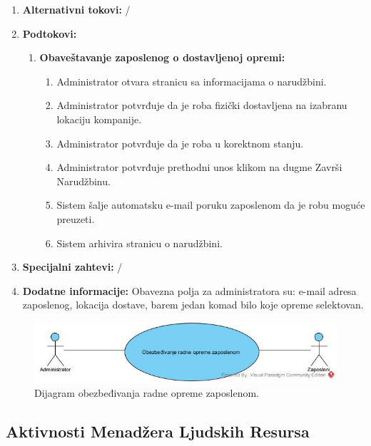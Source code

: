 \documentclass[a4paper]{article}
\begin{document}
\begin{enumerate}
\begin{enumerate}
        \end{enumerate}
    \item \textbf{Alternativni tokovi:} /
    \item \textbf{Podtokovi:}
        \begin{enumerate}
            \item \textbf{Obaveštavanje zaposlenog o dostavljenoj opremi:}
                \begin{enumerate}
                    \item Administrator otvara stranicu sa informacijama o narudžbini.
                    \item Administrator potvrđuje da je roba fizički dostavljena na izabranu lokaciju kompanije.
                    \item Administrator potvrđuje da je roba u korektnom stanju.
                    \item Administrator potvrđuje prethodni unos klikom na dugme Završi Narudžbinu.
                    \item Sistem šalje automatsku e-mail poruku zaposlenom da je robu moguće preuzeti.
                    \item Sistem arhivira stranicu o narudžbini.
                \end{enumerate}
        \end{enumerate}
    \item \textbf{Specijalni zahtevi:} /
    \item \textbf{Dodatne informacije:} Obavezna polja za administratora su: e-mail adresa zaposlenog, lokacija dostave, barem jedan komad bilo koje opreme selektovan.
\end{enumerate}

\begin{figure} [!ht]
    \begin{center}
        \includegraphics[scale=0.5]{Korisnici/Administrator/UML/SlucajUpotrebe_RadnaOprema.jpg}
    \end{center}
\caption{Dijagram obezbeđivanja radne opreme zaposlenom.}
\end{figure}

\newpage
\subsection{Aktivnosti Menadžera Ljudskih Resursa}
\end{document}

